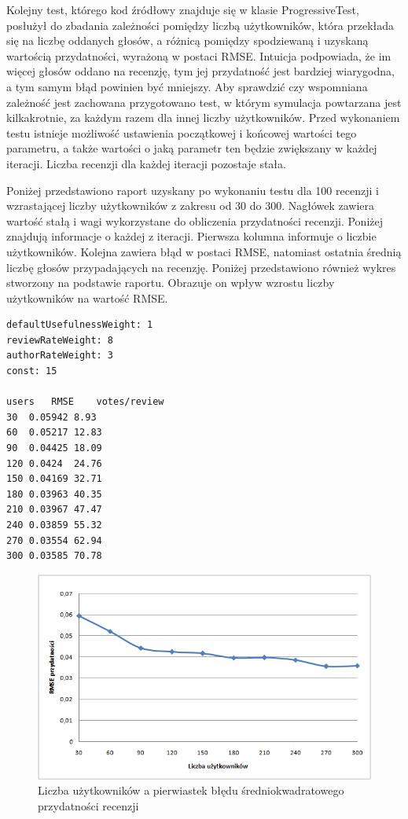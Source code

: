 Kolejny test, którego kod źródłowy znajduje się w klasie ProgressiveTest, posłużył do zbadania zależności pomiędzy liczbą użytkowników, która przekłada się na liczbę oddanych głosów, a różnicą pomiędzy spodziewaną i uzyskaną wartością przydatności, wyrażoną w postaci RMSE. Intuicja podpowiada, że im więcej głosów oddano na recenzję, tym jej przydatność jest bardziej wiarygodna, a tym samym błąd powinien być mniejszy. Aby sprawdzić czy wspomniana zależność jest zachowana przygotowano test, w którym symulacja powtarzana jest kilkakrotnie, za każdym razem dla innej liczby użytkowników. Przed wykonaniem testu istnieje możliwość ustawienia początkowej i końcowej wartości tego parametru, a także wartości o jaką parametr ten będzie zwiększany w każdej iteracji. Liczba recenzji dla każdej iteracji pozostaje stała.


Poniżej przedstawiono raport uzyskany po wykonaniu testu dla 100 recenzji i wzrastającej liczby użytkowników z zakresu od 30 do 300. Nagłówek zawiera wartość stałą i wagi wykorzystane do obliczenia przydatności recenzji. Poniżej znajdują informacje o każdej z iteracji. Pierwsza kolumna informuje o liczbie użytkowników. Kolejna zawiera błąd w postaci RMSE, natomiast ostatnia średnią liczbę głosów przypadających na recenzję. Poniżej przedstawiono również wykres stworzony na podstawie raportu. Obrazuje on wpływ wzrostu liczby użytkowników na wartość RMSE.

\begin{lstlisting}
defaultUsefulnessWeight: 1
reviewRateWeight: 8
authorRateWeight: 3
const: 15

users	RMSE	votes/review	
30	0.05942	8.93
60	0.05217	12.83
90	0.04425	18.09
120	0.0424	24.76
150	0.04169	32.71
180	0.03963	40.35
210	0.03967	47.47
240	0.03859	55.32
270	0.03554	62.94
300	0.03585	70.78
\end{lstlisting}

\begin{figure}[h]
	\centering
	\includegraphics[width=\textwidth, keepaspectratio=true]{images/ProgressiveTest.png}
	\caption{Liczba użytkowników a pierwiastek błędu średniokwadratowego przydatności recenzji}
\end{figure}

